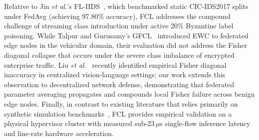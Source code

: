 \documentclass[journal,10pt,twocolumn]{IEEEtran}
\begin{document}
Relative to Jin \emph{et al.}'s FL-IIDS~\cite{jin2024fliids}, which benchmarked static CIC-IDS2017 splits under FedAvg (achieving 97.80\% accuracy), FCL addresses the compound challenge of streaming class introduction under active 20\% Byzantine label poisoning. While Talpur and Gurusamy's GFCL~\cite{talpur2022gfcl} introduced EWC to federated edge nodes in the vehicular domain, their evaluation did not address the Fisher diagonal collapse that occurs under the severe class imbalance of encrypted enterprise traffic. Liu \emph{et al.}~\cite{liu2026ewc} recently identified empirical Fisher diagonal inaccuracy in centralized vision-language settings; our work extends this observation to decentralized network defense, demonstrating that federated parameter averaging propagates and compounds local Fisher failure across benign edge nodes. Finally, in contrast to existing literature that relies primarily on synthetic simulation benchmarks~\cite{hamedi2025federated, hernandez2025intrusion}, FCL provides empirical validation on a physical hypervisor cluster with measured sub-23\,$\mu$s single-flow inference latency and line-rate hardware acceleration.
\end{document}
